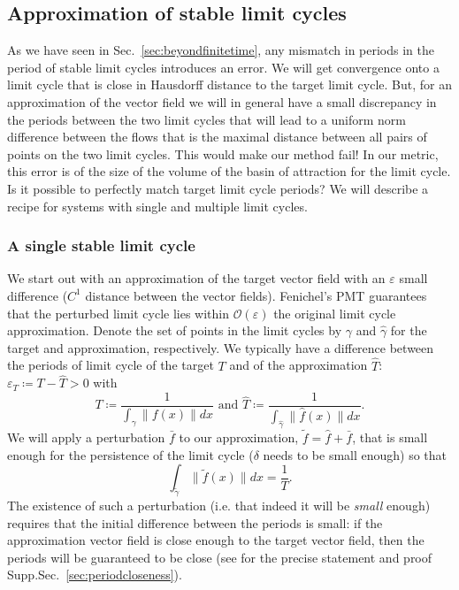 \documentclass{article}
\theoremstyle{definition} \newtheorem{definition}{Definition}
\theoremstyle{remark} \newtheorem{remark}{Remark}
\newcounter{ct}
\begin{document}
\subsection{Approximation of stable limit cycles}\label{sec:lc_theorem}
As we have seen in Sec.~\ref{sec:beyondfinitetime}, any mismatch in periods in the period of stable limit cycles introduces an error.
We will get convergence onto a limit cycle that is close in Hausdorff distance to the target limit cycle. %
But, for an approximation of the vector field we will in general have a small discrepancy in the periods between the two limit cycles that will lead to a uniform norm difference between the flows that is the maximal distance between all pairs of points on the two limit cycles.
This would make our method fail!
In our metric, this error is of the size of the volume of the basin of attraction for the limit cycle.
Is it possible to perfectly match target limit cycle periods?
We will describe a recipe for systems with single and multiple limit cycles.


\subsubsection{A single stable limit cycle}
We start out with an approximation of the target vector field with an $\varepsilon$ small difference ($C^1$ distance between the vector fields).
Fenichel's PMT guarantees that the perturbed limit cycle lies within $\mathcal{O}(\varepsilon)$ the original limit cycle approximation.
Denote the set of points in the limit cycles by $\gamma$ and $\hat\gamma$ for the target and approximation, respectively.
%
We typically have a difference between the periods of limit cycle of the target $T$ and of the approximation $\hat T$: $\varepsilon_T\coloneqq T-\hat T>0$
with \[T\coloneqq\frac{1}{\int_{\gamma}\|f(x)\|dx} \text{ and } \hat T\coloneqq\frac{1}{\int_{\hat{\gamma}}\|\hat f(x)\|dx}.\]
%
We will apply a perturbation $\bar{f}$ to our approximation, $\tilde f = \hat f + \bar f$, that is small enough for the persistence of the limit cycle ($\delta$ needs to be small enough) 
so that 
\begin{equation}\label{eq:lc_constraint}
\int_{\tilde{\gamma}}\|\tilde{f}(x)\| dx = \frac{1}{T}. 	%
\end{equation}
The existence of such a perturbation (i.e. that indeed it will be \emph{small} enough) requires that the initial difference between the periods is small:
if the approximation vector field is close enough to the target vector field, then the periods will be guaranteed to be close (see for the precise statement and proof Supp.Sec.~\ref{sec:periodcloseness}).
\end{document}
